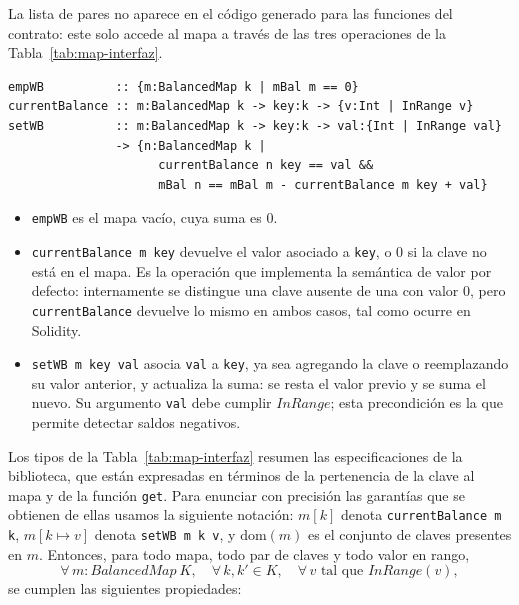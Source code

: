 La lista de pares no aparece en el código generado para las funciones del contrato:
este solo accede al mapa a través de las tres operaciones de la
Tabla~\ref{tab:map-interfaz}.

\begin{table}[ht]
\begin{lstlisting}[language=LHaskell, frame=lines, aboveskip=0pt, belowskip=0pt]
empWB          :: {m:BalancedMap k | mBal m == 0}
currentBalance :: m:BalancedMap k -> key:k -> {v:Int | InRange v}
setWB          :: m:BalancedMap k -> key:k -> val:{Int | InRange val}
               -> {n:BalancedMap k |
                     currentBalance n key == val &&
                     mBal n == mBal m - currentBalance m key + val}
\end{lstlisting}
\caption{Interfaz de \lstinline|BalancedMap| (tipos simplificados).}
\label{tab:map-interfaz}
\end{table}

\begin{itemize}
  \item \lstinline|empWB| es el mapa vacío, cuya suma es $0$.
  \item \lstinline|currentBalance m key| devuelve el valor asociado a \lstinline|key|,
    o $0$ si la clave no está en el mapa. Es la operación que implementa la semántica
    de valor por defecto: internamente se distingue una clave ausente de una con valor
    $0$, pero \lstinline|currentBalance| devuelve lo mismo en ambos casos, tal como
    ocurre en Solidity.
  \item \lstinline|setWB m key val| asocia \lstinline|val| a \lstinline|key|, ya sea
    agregando la clave o reemplazando su valor anterior, y actualiza la suma: se resta
    el valor previo y se suma el nuevo. Su argumento \lstinline|val| debe cumplir
    $\mathit{InRange}$; esta precondición es la que permite detectar saldos negativos.
\end{itemize}

Los tipos de la Tabla~\ref{tab:map-interfaz} resumen las especificaciones de la
biblioteca, que están expresadas en términos de la pertenencia de la clave al mapa y
de la función \lstinline|get|. Para enunciar con precisión las garantías que se
obtienen de ellas usamos la siguiente notación: $m[k]$ denota
\lstinline|currentBalance m k|, $m[k \mapsto v]$ denota \lstinline|setWB m k v|, y
$\mathrm{dom}(m)$ es el conjunto de claves presentes en $m$. Entonces, para todo
mapa, todo par de claves y todo valor en rango,
\[
  \forall\, m : \mathit{BalancedMap}\ K,\quad
  \forall\, k, k' \in K,\quad
  \forall\, v \text{ tal que } \mathit{InRange}(v),
\]
se cumplen las siguientes propiedades:

